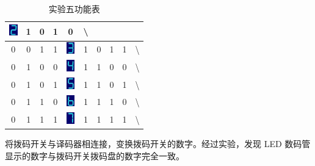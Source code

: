 \documentclass[a4paper,11pt,UTF8]{ctexart}
\begin{document}
\begin{table}[H]
\begin{tabular}{|cccc|c|cccc|c|}
\begin{minipage}{0.1\textwidth}
	   \includegraphics[height=0.5cm]{Digit2}
	  \end{minipage}
	  &1&0&1&0&	\textbackslash
	  \\\hline
	  0&0&1&1&
	  \begin{minipage}{0.1\textwidth}
	   \centering
	   \includegraphics[height=0.5cm]{Digit3}
	  \end{minipage}
	  &1&0&1&1&	\textbackslash
	  \\\hline
	  0&1&0&0&
	  \begin{minipage}{0.1\textwidth}
	   \centering
	   \includegraphics[height=0.5cm]{Digit4}
	  \end{minipage}
	  &1&1&0&0&	\textbackslash
	  \\\hline
	  0&1&0&1&
	  \begin{minipage}{0.1\textwidth}
	   \centering
	   \includegraphics[height=0.5cm]{Digit5}
	  \end{minipage}
	  &1&1&0&1&	\textbackslash
	  \\\hline
	  0&1&1&0&
	  \begin{minipage}{0.1\textwidth}
	   \centering
	   \includegraphics[height=0.5cm]{Digit6}
	  \end{minipage}
	  &1&1&1&0&	\textbackslash
	  \\\hline
	  0&1&1&1&
	  \begin{minipage}{0.1\textwidth}
	   \centering
	   \includegraphics[height=0.5cm]{Digit7}
	  \end{minipage}
	  &1&1&1&1&	\textbackslash
	  \\\hline
	 \end{tabular}
	 \caption{实验五功能表}
	\end{table}
	\par 将拨码开关与译码器相连接，变换拨码开关的数字。经过实验，发现 LED 数码管显示的数字与拨码开关拨码盘的数字完全一致。
	
\end{document}
